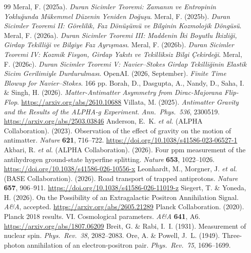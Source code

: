 \documentclass[12pt,a4paper]{article}
\begin{document}
\begin{thebibliography}{99}
     Meral, F. (2025a). \textit{Duran Sicimler Teoremi: Zamanın ve Entropinin Yokluğunda Mükemmel Düzenin Yeniden Doğuşu}.
     Meral, F. (2025b). \textit{Duran Sicimler Teoremi II: Görelilik, Faz Dönüşümü ve Bilginin Kozmolojik Döngüsü}.
     Meral, F. (2026a). \textit{Duran Sicimler Teoremi III: Maddenin İki Boyutlu İkizliği, Girdap Tekilliği ve Bilgiye Faz Ayrışması}.
     Meral, F. (2026b). \textit{Duran Sicimler Teoremi IV: Kozmik Fisyon, Girdap Yakıtı ve Tekilliksiz Bilgi Çekirdeği}.
     Meral, F. (2026c). \textit{Duran Sicimler Teoremi V: Navier--Stokes Girdap Tekilliğinin Elastik Sicim Gerilimiyle Durdurulması}.
     OpenAI. (2026, September). \textit{Finite Time Blowup for Navier--Stokes}. 166 pp.
     Borah, D., Dasgupta, A., Nandy, D., Saha, I. \& Singh, H. (2026). \textit{Matter-Antimatter Asymmetry from Dirac-Majorana Flip-Flop}. \url{https://arxiv.org/abs/2610.10688}
     Villata, M. (2025). \textit{Antimatter Gravity and the Results of the ALPHA-g Experiment}. \textit{Ann.\ Phys.\ 536}, 2300519. \url{https://arxiv.org/abs/2503.03846}
     Anderson, E.~K. \textit{et al.} (ALPHA Collaboration). (2023). Observation of the effect of gravity on the motion of antimatter. \textit{Nature} \textbf{621}, 716--722. \url{https://doi.org/10.1038/s41586-023-06527-1}
     Akbari, R. \textit{et al.} (ALPHA Collaboration). (2026). Four ppm measurement of the antihydrogen ground-state hyperfine splitting. \textit{Nature} \textbf{653}, 1022--1026. \url{https://doi.org/10.1038/s41586-026-10556-x}
     Leonhardt, M., Morgner, J. \textit{et al.} (BASE Collaboration). (2026). Road transport of trapped antiprotons. \textit{Nature} \textbf{657}, 906--911. \url{https://doi.org/10.1038/s41586-026-11019-z}
     Siegert, T. \& Yoneda, H. (2026). On the Possibility of an Extragalactic Positron Annihilation Signal. \textit{A\&A}, accepted. \url{https://arxiv.org/abs/2605.21289}
     Planck Collaboration. (2020). Planck 2018 results. VI. Cosmological parameters. \textit{A\&A} \textbf{641}, A6. \url{https://arxiv.org/abs/1807.06209}
     Breit, G. \& Rabi, I.~I. (1931). Measurement of nuclear spin. \textit{Phys.\ Rev.\ 38}, 2082--2083.
     Ore, A. \& Powell, J.~L. (1949). Three-photon annihilation of an electron-positron pair. \textit{Phys.\ Rev.\ 75}, 1696--1699.
\end{thebibliography}
\end{document}
